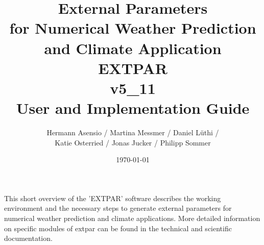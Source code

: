 \documentclass[a4paper,10pt,DIV14,BCOR1cm,titlepage,twoside]{scrartcl}
\title{External Parameters \\ 
for Numerical Weather Prediction 
and Climate Application \\
EXTPAR\\
v5\_11 \\
User and Implementation Guide}
\author{
  Hermann Asensio / Martina Messmer / Daniel L\"uthi / \\
  Katie Osterried / Jonas Jucker / Philipp Sommer
}
\date{\today}
\begin{document}
  

\renewcommand{\thefootnote}{\fnsymbol{footnote}}  

\maketitle  
\renewcommand{\thefootnote}{\arabic{footnote}}  

\cleardoublepage

\tableofcontents

\cleardoublepage


\noindent This short overview of the 'EXTPAR' software describes the working environment and the necessary steps to generate external parameters for numerical weather prediction and climate applications. More detailed information on specific modules of extpar can be found in the technical and scientific documentation.\par\medskip\noindent
\end{document}
